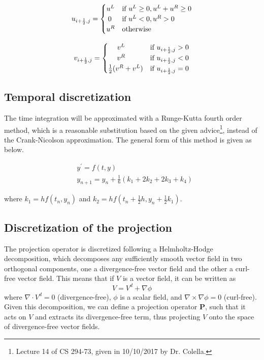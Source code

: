 \documentclass{article}
\begin{document}
\[
\label{eq:defu}
	u_{i+\frac{1}{2},j} =
		\begin{cases}
        \hfill u^L \hfill &\text{if } u^L \geq 0, u^L +u^R \geq 0\\
		\hfill 0 \hfill & \text{if } u^L < 0, u^R > 0\\
		\hfill u^R \hfill & \text{otherwise}   
	   \end{cases}
\]

\[
   v_{i+\frac{1}{2},j} =
		\begin{cases}
			\hfill v^L \hfill & \text{if }  u_{i+\frac{1}{2},j} > 0\\
			\hfill v^R \hfill & \text{if } u_{i+\frac{1}{2},j} < 0\\
			\hfill \frac{1}{2}(v^R+v^L) \hfill & \text{if } u_{i+\frac{1}{2},j} = 0
		\end{cases}
\]
 
\subsection{Temporal discretization}

The time integration will be approximated with a Runge-Kutta fourth order method, which is a reasonable substitution based on the given advice\footnote{Lecture 14 of CS 294-73, given in 10/10/2017 by Dr. Colella.}, instead of the Crank-Nicolson approximation. The general form of this method is given as below.

 \begin{equation}
\label{eq:rk4}
\begin{split}
&y^\prime = f(t,y) \\
&y_{n+1} = y_n + \frac{1}{6}( k_1 + 2k_2 + 2k_3 + k_4)
\end{split}
 \end{equation}
 
where $k_1 = hf(t_n,y_n)$ and  $k_2 = hf(t_n + \frac{1}{2}h, y_n + \frac{1}{2}k_1)$.

\subsection{Discretization of the projection}
\label{ssec:projection}

The projection operator is discretized following a Helmholtz-Hodge decomposition, which decomposes any sufficiently smooth vector field in two orthogonal components, one a divergence-free vector field and the other a curl-free vector field. This means that if $V$ is a vector field, it can be written as
\begin{equation}
\label{eq:hodge}
	V = V^d + \nabla \phi
\end{equation}
where $\nabla \cdot V^d = 0$ (divergence-free), $\phi$ is a scalar field, and $\nabla \times \nabla \phi = 0$ (curl-free). Given this decomposition, we can define a projection operator $\mathbf{P}$, such that it acts on $V$ and extracts its divergence-free term, thus projecting $V$ onto the space of divergence-free vector fields.
\end{document}

